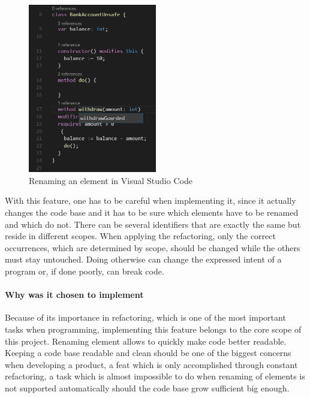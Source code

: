 \begin{figure}[H]
	\centering
	\includegraphics[width=0.5\textwidth]{img/rename}
	\caption{Renaming an element in Visual Studio Code}
	\label{fig:agrename}
\end{figure}

With this feature, one has to be careful when implementing it, since it actually changes the code base and it has to be sure which elements have to be renamed and which do not. There can be several identifiers that are exactly the same but reside in different scopes. When applying the refactoring, only the correct occurrences, which are determined by scope, should be changed while the others must stay untouched. Doing otherwise can change the expressed intent of a program or, if done poorly, can break code.

\paragraph{Why was it chosen to implement}
Because of its importance in refactoring, which is one of the most important tasks when programming, implementing this feature belongs to the core scope of this project. Renaming element allows to quickly make code better readable.\newline
Keeping a code base readable and clean should be one of the biggest concerns when developing a product, a feat which is only accomplished through constant refactoring, a task which is almost impossible to do when renaming of elements is not supported automatically should the code base grow sufficient big enough.

